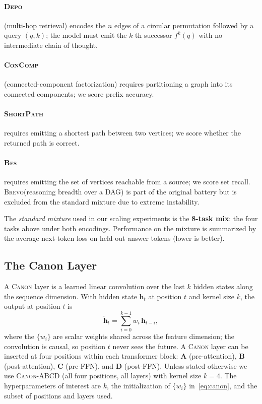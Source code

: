 \documentclass{article}
\newcommand{\Canon}{\textsc{Canon}\xspace}
\newcommand{\Depo}{\textsc{Depo}\xspace}
\newcommand{\Brevo}{\textsc{Brevo}\xspace}
\newcommand{\Bfs}{\textsc{Bfs}\xspace}
\newcommand{\Concomp}{\textsc{ConComp}\xspace}
\newcommand{\ShortPath}{\textsc{ShortPath}\xspace}
\begin{document}
\paragraph{\Depo} (multi-hop retrieval) encodes the $n$ edges of a circular permutation
followed by a query $(q,k)$; the model must emit the $k$-th successor $f^{k}(q)$ with no
intermediate chain of thought.
\paragraph{\Concomp} (connected-component factorization) requires partitioning a graph into
its connected components; we score prefix accuracy.
\paragraph{\ShortPath} requires emitting a shortest path between two vertices; we score whether
the returned path is correct.
\paragraph{\Bfs} requires emitting the set of vertices reachable from a source; we score set
recall. \Brevo (reasoning breadth over a DAG) is part of the original battery but is excluded
from the standard mixture due to extreme instability.

The \emph{standard mixture} used in our scaling experiments is the \textbf{8-task mix}: the four
tasks above under both encodings. Performance on the mixture is summarized by the average
next-token loss on held-out answer tokens (lower is better).

\subsection{The Canon Layer}
\label{sec:background:canon}

A \Canon layer is a learned linear convolution over the last $k$ hidden states along the
sequence dimension. With hidden state $\mathbf{h}_t$ at position $t$ and kernel size $k$,
the output at position $t$ is
\begin{equation}
  \tilde{\mathbf{h}}_t = \sum_{i=0}^{k-1} w_i\, \mathbf{h}_{t-i},
  \label{eq:canon}
\end{equation}
where the $\{w_i\}$ are scalar weights shared across the feature dimension; the convolution is
causal, so position $t$ never sees the future. A \Canon layer can be inserted at four positions
within each transformer block: \textbf{A} (pre-attention), \textbf{B} (post-attention),
\textbf{C} (pre-FFN), and \textbf{D} (post-FFN). Unless stated otherwise we use \Canon-ABCD
(all four positions, all layers) with kernel size $k=4$. The hyperparameters of interest are
$k$, the initialization of $\{w_i\}$ in~\eqref{eq:canon}, and the subset of positions and
layers used.
\end{document}
